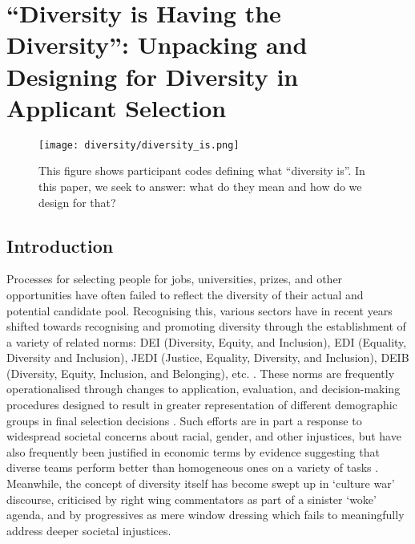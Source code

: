 

\chapter{\label{ch:iaicodesign}``Diversity is Having the Diversity'': Unpacking and Designing for Diversity in Applicant Selection}

\minitoc

\begin{figure}
    \texttt{[image: diversity/diversity\_is.png]}
    \caption{This figure shows participant codes defining what ``diversity is''. In this paper, we seek to answer: what do they mean and how do we design for that?}
    \label{fig:diversity_is_teaser}
\end{figure}
  
\section{Introduction}\label{sec:intro}
Processes for selecting people for jobs, universities, prizes, and other opportunities have often failed to reflect the diversity of their actual and potential candidate pool. Recognising this, various sectors have in recent years shifted towards recognising and promoting diversity through the establishment of a variety of related norms: DEI (Diversity, Equity, and Inclusion), EDI (Equality, Diversity and Inclusion), JEDI (Justice, Equality, Diversity, and Inclusion), DEIB (Diversity, Equity, Inclusion, and Belonging), etc. \cite{pinkett2023data,hsieh2019allocation,minkin2023diversity}. These norms are frequently operationalised through changes to application, evaluation, and decision-making procedures designed to result in greater representation of different demographic groups in final selection decisions \cite{pinkett2023data}. Such efforts are in part a response to widespread societal concerns about racial, gender, and other injustices, but have also frequently been justified in economic terms by evidence suggesting that diverse teams perform better than homogeneous ones on a variety of tasks \cite{deming2017growing,page2019diversity,noray2023systemic}. Meanwhile, the concept of diversity itself has become swept up in `culture war' discourse, criticised by right wing commentators as part of a sinister `woke' agenda, and by progressives as mere window dressing which fails to meaningfully address deeper societal injustices. 

